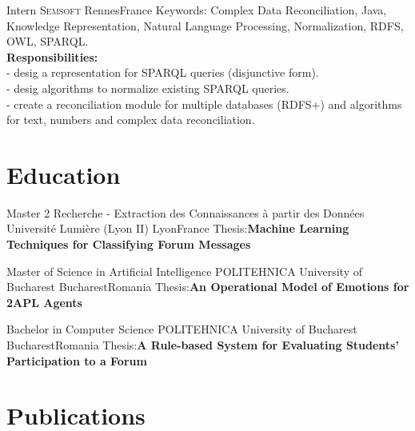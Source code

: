 \documentclass[11pt,a4paper,sans]{moderncv}
\begin{document}
{Intern}
{\textsc{Semsoft}}
{Rennes}{France}
{Keywords: Complex Data Reconciliation, Java,  Knowledge Representation, 
    Natural Language Processing, Normalization, RDFS, OWL, SPARQL. \\ 
\textbf{Responsibilities:} \\ 
- desig a representation for SPARQL queries (disjunctive form). \\ 
- desig algorithms to normalize existing SPARQL queries. \\ 
- create a reconciliation module for multiple databases (RDFS+) and algorithms 
for text, numbers and complex data reconciliation.}



\newpage
\section{Education}
{Master 2 Recherche - Extraction des Connaissances \`a partir des Donn\'ees}
{Universit\'e Lumi\`ere (Lyon II)}
{Lyon}{France}
{Thesis:\textbf{Machine Learning Techniques for Classifying Forum Messages}}

{Master of Science in Artificial Intelligence}
{POLITEHNICA University of Bucharest}
{Bucharest}{Romania}
{Thesis:\textbf{An Operational Model of Emotions for 2APL Agents}}

{Bachelor in Computer Science}
{POLITEHNICA University of Bucharest}
{Bucharest}{Romania}
{Thesis:\textbf{A Rule-based System for Evaluating Students' Participation to a Forum}}



\section{Publications}
\end{document}
